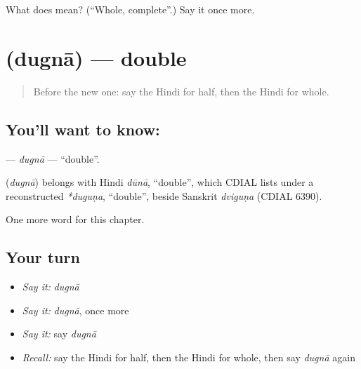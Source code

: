 \begin{tcolorbox}[breakable,colback=teal!4,colframe=teal!35!black,title={Before you move on}]
What does  mean? (\textquotedblleft{}Whole, complete\textquotedblright{}.) Say it once more.
\end{tcolorbox}
\section[\texorpdfstring{\hi{दुगना} (dugnā)}{दुगना (dugnā)}]{ (dugnā) — double}

\label{lesson:HI-C236-dugna}



\begin{quote}
Before the new one: say the Hindi for half, then the Hindi for whole.
\end{quote}

\subsection*{You'll want to know: }
\textbf{} — \emph{dugnā} — \textquotedblleft{}double\textquotedblright{}.

\begin{cousinweb}
\textbf{} (\emph{dugnā}) belongs with Hindi \emph{dūnā}, \textquotedblleft{}double\textquotedblright{}, which CDIAL lists under a reconstructed \emph{*duguṇa}, \textquotedblleft{}double\textquotedblright{}, beside Sanskrit \emph{dviguṇa} (CDIAL 6390).
\end{cousinweb}

\begin{grammarlens}[title={What you've built}]
One more word for this chapter.
\end{grammarlens}

\subsection*{Your turn}
\begin{itemize}
\raggedright
  \item \emph{Say it:} \emph{dugnā}
  \item \emph{Say it:} \emph{dugnā}, once more
  \item \emph{Say it:} say \emph{dugnā}
  \item \emph{Recall:} say the Hindi for half, then the Hindi for whole, then say \emph{dugnā} again
\end{itemize}

